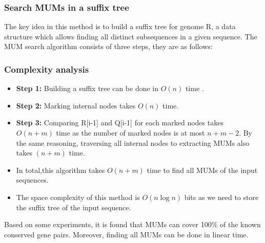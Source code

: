 \documentclass[runningheads,a4paper]{llncs}
\begin{document}
{\subsubsection{Search MUMs in a suffix tree} 
The key idea in this method is to build a suffix tree for genome R, a data structure which allows finding all distinct subsequences in a given sequence. The MUM search algorithm consists of three steps, they are as follows:
\begin{algorithmic}
  \ENDIF
  \ENDFOR
\end{algorithmic}
\subsubsection{Complexity analysis} 
\begin{itemize}
  \item \textbf{Step 1:} Building a suffix tree can be done in $O(n)$ time \cite{kurtz}.
  \item \textbf{Step 2:} Marking internal nodes takes $O(n)$ time. 
  \item \textbf{Step 3:} Comparing R[i-1] and Q[i-1] for each marked nodes takes $O(n+m)$ time as the number of marked nodes is at most $n+m-2$. By the same reasoning, traversing all internal nodes to extracting MUMs also takes $(n+m)$ time.
  \item In total,this algorithm takes $O(n+m)$ time to find all MUMs of the input sequences.
  \item The space complexity of this method is $O\left(n\log n\right)$ bits as we need to store the suffix tree of the input sequence.
\end{itemize}
Based on some experiments, it is found that MUMs can cover 100\% of the known conserved gene pairs. Moreover, finding all MUMs can be done in linear time.
}
\end{document}
